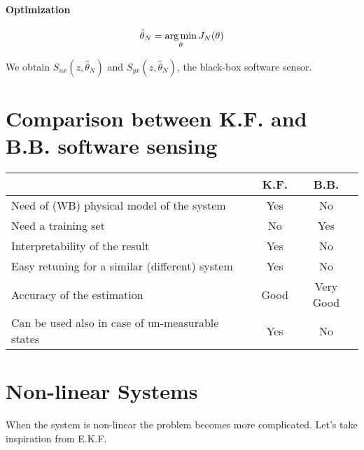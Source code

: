 \paragraph{Optimization}
\[
    \hat{\theta}_N = \operatorname*{arg\,min}_\theta J_N(\theta)
\]

We obtain $S_{ux}(z, \hat{\theta}_N)$ and $S_{yx}(z, \hat{\theta}_N)$, the black-box software sensor.

\section{Comparison between K.F. and B.B. software sensing}

\begin{center}
    \begin{tabular}{l|c|c}
        & \textbf{K.F.} & \textbf{B.B.} \\
        \hline
        Need of (WB) physical model of the system & \color{red} Yes & \color{green} No \\
        Need a training set & \color{green} No & \color{red} Yes \\
        Interpretability of the result & \color{green} Yes & \color{red} No \\
        Easy retuning for a similar (different) system & \color{green} Yes & \color{red} No \\
        Accuracy of the estimation & \color{green} Good & \color{green} Very Good \\
        Can be used also in case of un-measurable states & \color{green} Yes & \color{red} No \\
    \end{tabular}
\end{center}

\section{Non-linear Systems}

When the system is non-linear the problem becomes more complicated.
Let's take inspiration from E.K.F.

